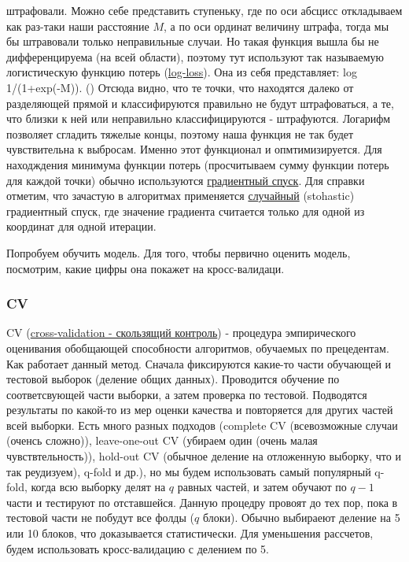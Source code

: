 \documentclass[11pt]{article}
\begin{document}
штрафовали. Можно себе представить ступеньку, где по оси абсцисс
откладываем как раз-таки наши расстояние \(M\), а по оси ординат
величину штрафа, тогда мы бы штравовали только неправильные случаи. Но
такая функция вышла бы не дифференцируема (на всей области), поэтому тут
используют так называемую логистическую функцию потерь
(\href{http://wiki.fast.ai/index.php/Log_Loss}{log-loss}). Она из себя
представляет: log 1/(1+exp(-M)). () Отсюда видно, что те точки, что
находятся далеко от разделяющей прямой и классифируются правильно не
будут штрафоваться, а те, что близки к ней или неправильно
классифицируются - штрафуются. Логарифм позволяет сгладить тяжелые
концы, поэтому наша функция не так будет чувствительна к выбросам.
Именно этот функционал и опмтимизируется. Для находждения минимума
функции потерь (просчитываем сумму функции потерь для каждой точки)
обычно используются
\href{https://en.wikipedia.org/wiki/Gradient_descent}{градиентный
спуск}. Для справки отметим, что зачастую в алгоритмах применяется
\href{https://en.wikipedia.org/wiki/Stochastic_gradient_descent}{случайный}
(stohastic) градиентный спуск, где значение градиента считается только
для одной из координат для одной итерации.

    Попробуем обучить модель. Для того, чтобы первично оценить модель,
посмотрим, какие цифры она покажет на кросс-валидаци.

    \subsubsection{CV}\label{cv}

    CV
(\href{http://www.machinelearning.ru/wiki/index.php?title=\%D0\%A1\%D0\%BA\%D0\%BE\%D0\%BB\%D1\%8C\%D0\%B7\%D1\%8F\%D1\%89\%D0\%B8\%D0\%B9_\%D0\%BA\%D0\%BE\%D0\%BD\%D1\%82\%D1\%80\%D0\%BE\%D0\%BB\%D1\%8C}{cross-validation
- скользящий контроль}) - процедура эмпирического оценивания обобщающей
способности алгоритмов, обучаемых по прецедентам. Как работает данный
метод. Сначала фиксируются какие-то части обучающей и тестовой выборок
(деление общих данных). Проводится обучение по соответсвующей части
выборки, а затем проверка по тестовой. Подводятся результаты по какой-то
из мер оценки качества и повторяется для других частей всей выборки.
Есть много разных подходов (complete CV (всевозможные случаи (оченсь
сложно)), leave-one-out CV (убираем один (очень малая чувствтельность)),
hold-out CV (обычное деление на отложенную выборку, что и так
реудизуем), q-fold и др.), но мы будем использовать самый популярный
q-fold, когда всю выборку делят на \(q\) равных частей, и затем обучают
по \(q-1\) части и тестируют по отставшейся. Данную процедру провоят до
тех пор, пока в тестовой части не побудут все фолды (\(q\) блоки).
Обычно выбираеют деление на 5 или 10 блоков, что доказывается
статистически. Для уменьшения рассчетов, будем использовать
кросс-валидацию с делением по 5.
\end{document}
